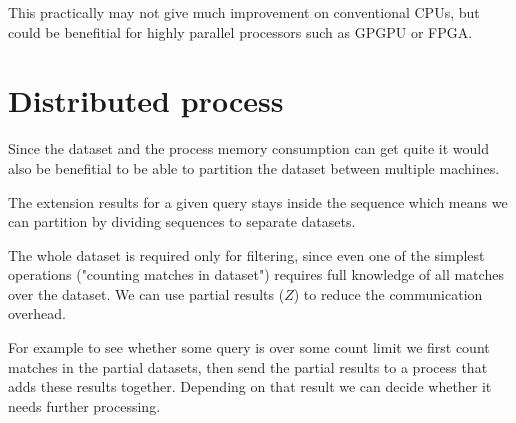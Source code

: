 
This practically may not give much improvement on conventional CPUs, but could be benefitial for highly parallel processors such as GPGPU or FPGA.

\section{Distributed process}

Since the dataset and the process memory consumption can get quite it would also be benefitial to be able to partition the dataset between multiple machines.

The extension results for a given query stays inside the sequence which means we can partition by dividing sequences to separate datasets.

The whole dataset is required only for filtering, since even one of the simplest operations ("counting matches in dataset") requires full knowledge of all matches over the dataset. We can use partial results ($Z$) to reduce the communication overhead.

\begin{figure}[H]
	
\end{figure}

For example to see whether some query is over some count limit we first count matches in the partial datasets, then send the partial results to a process that adds these results together. Depending on that result we can decide whether it needs further processing.

